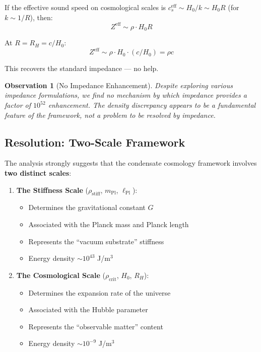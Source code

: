 \documentclass[11pt,a4paper]{article}
\newcommand{\lPl}{\ensuremath{\ell_{\mathrm{Pl}}}}
\newcommand{\mPl}{\ensuremath{m_{\mathrm{Pl}}}}
\newcommand{\rhocrit}{\ensuremath{\rho_{\mathrm{crit}}}}
\newcommand{\rhostiff}{\ensuremath{\rho_{\mathrm{stiff}}}}
\newtheorem{observation}{Observation}
\theoremstyle{definition}
\begin{document}
If the effective sound speed on cosmological scales is $c_s^{\mathrm{eff}} \sim H_0/k \sim H_0 R$ (for $k \sim 1/R$), then:
\begin{equation}
Z^{\mathrm{eff}} \sim \rho \cdot H_0 R
\end{equation}

At $R = R_H = c/H_0$:
\begin{equation}
Z^{\mathrm{eff}} \sim \rho \cdot H_0 \cdot (c/H_0) = \rho c
\end{equation}

This recovers the standard impedance --- no help.

\begin{observation}[No Impedance Enhancement]
Despite exploring various impedance formulations, we find no mechanism by which impedance provides a factor of $10^{52}$ enhancement. The density discrepancy appears to be a fundamental feature of the framework, not a problem to be resolved by impedance.
\end{observation}

\subsection{Resolution: Two-Scale Framework}
\label{sec:two_scale}

The analysis strongly suggests that the condensate cosmology framework involves \textbf{two distinct scales}:

\begin{enumerate}
    \item \textbf{The Stiffness Scale} ($\rhostiff$, $\mPl$, $\lPl$):
    \begin{itemize}
        \item Determines the gravitational constant $G$
        \item Associated with the Planck mass and Planck length
        \item Represents the ``vacuum substrate'' stiffness
        \item Energy density $\sim 10^{43}$ J/m$^3$
    \end{itemize}

    \item \textbf{The Cosmological Scale} ($\rhocrit$, $H_0$, $R_H$):
    \begin{itemize}
        \item Determines the expansion rate of the universe
        \item Associated with the Hubble parameter
        \item Represents the ``observable matter'' content
        \item Energy density $\sim 10^{-9}$ J/m$^3$
    \end{itemize}
\end{enumerate}
\end{document}
